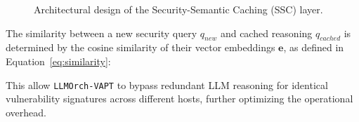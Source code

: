 \begin{figure}[!t]
    \centering
    \resizebox{0.7\textwidth}{!}{
        
    }
    \caption{Architectural design of the Security-Semantic Caching (SSC) layer.}
    \label{fig:ssc_mechanism}
\end{figure}

The similarity between a new security query $q_{new}$ and cached reasoning $q_{cached}$ is determined by the cosine similarity of their vector embeddings $\mathbf{e}$, as defined in Equation~\ref{eq:similarity}:


This allow \texttt{LLMOrch-VAPT} to bypass redundant LLM reasoning for identical vulnerability signatures across different hosts, further optimizing the operational overhead.
